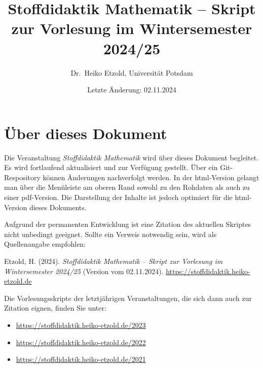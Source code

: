 \documentclass[
]{scrbook}
\title{Stoffdidaktik Mathematik -- Skript zur Vorlesung im Wintersemester 2024/25}
\author{Dr.~Heiko Etzold, Universität Potsdam}
\date{Letzte Änderung: 02.11.2024}
\makeatletter
\providecommand{\tightlist}{%
  \setlength{\itemsep}{0pt}\setlength{\parskip}{0pt}}
\renewenvironment{quote}{
  \list{}{
	\leftmargin0.2cm   %
    \rightmargin\leftmargin
      	\def\FrameCommand
    {%
        {\color{quoteColor}\vrule width 2pt}%
        \hspace{0pt}%
    }%
    \MakeFramed{\advance \hsize -\width \FrameRestore}    \color{quoteColor}
    }
  \item\relax
}
{\endlist\color{black}\endMakeFramed}
\def\renewtheorem#1{%
  \expandafter\let\csname#1\endcsname\relax
  \expandafter\let\csname c@#1\endcsname\relax
  \gdef\renewtheorem@envname{#1}
  \renewtheorem@secpar
}
\def\renewtheorem@secpar{\@ifnextchar[{\renewtheorem@numberedlike}{\renewtheorem@nonumberedlike}}
\def\renewtheorem@numberedlike[#1]#2{\newtheorem{\renewtheorem@envname}[#1]{#2}}
\def\renewtheorem@nonumberedlike#1{
\def\renewtheorem@caption{#1}
\edef\renewtheorem@nowithin{\noexpand\newtheorem{\renewtheorem@envname}{\renewtheorem@caption}}
\renewtheorem@thirdpar
}
\def\renewtheorem@thirdpar{\@ifnextchar[{\renewtheorem@within}{\renewtheorem@nowithin}}
\def\renewtheorem@within[#1]{\renewtheorem@nowithin[#1]}
\theoremstyle{definition}
\theoremstyle{definition}
\theoremstyle{definition}
\theoremstyle{definition}
\theoremstyle{remark}
\makeatother
\begin{document}
\maketitle

%

{
\hypersetup{linkcolor=}
\setcounter{tocdepth}{1}
\tableofcontents
}
\chapter*{Über dieses Dokument}\label{uxfcber-dieses-dokument}

Die Veranstaltung \emph{Stoffdidaktik Mathematik} wird über dieses Dokument begleitet. Es wird fortlaufend aktualisiert und zur Verfügung gestellt. Über ein Git-Respository können Änderungen nachverfolgt werden.
In der html-Version gelangt man über die Menüleiste am oberen Rand sowohl zu den Rohdaten als auch zu einer pdf-Version. Die Darstellung der Inhalte ist jedoch optimiert für die html-Version dieses Dokuments.

Aufgrund der permanenten Entwicklung ist eine Zitation des aktuellen Skriptes nicht unbedingt geeignet. Sollte ein Verweis notwendig sein, wird als Quellenangabe empfohlen:

\begin{quote}
Etzold, H. (2024). \emph{Stoffdidaktik Mathematik -- Skript zur Vorlesung im Wintersemester 2024/25} (Version vom 02.11.2024). \url{https://stoffdidaktik.heiko-etzold.de}
\end{quote}

Die Vorlesungsskripte der letztjährigen Veranstaltungen, die sich dann auch zur Zitation eignen, finden Sie unter:

\begin{itemize}
\tightlist
\item
  \url{https://stoffdidaktik.heiko-etzold.de/2023}
\item
  \url{https://stoffdidaktik.heiko-etzold.de/2022}
\item
  \url{https://stoffdidaktik.heiko-etzold.de/2021}
\end{itemize}
\end{document}

